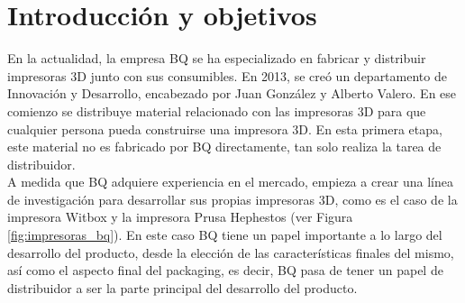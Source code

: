 \chapter{Introducción y objetivos}
\label{cap:introduccion}

En la actualidad, la empresa BQ se ha especializado en fabricar y distribuir impresoras 3D junto con sus consumibles. En 2013, se creó un departamento de Innovación y Desarrollo, encabezado por Juan González y Alberto Valero. En ese comienzo se distribuye material relacionado con las impresoras 3D para que cualquier persona pueda construirse una impresora 3D. En esta primera etapa, este material no es fabricado por BQ directamente, tan solo realiza la tarea de distribuidor.\\

A medida que BQ adquiere experiencia en el mercado, empieza a crear una línea de investigación para desarrollar sus propias impresoras 3D, como es el caso de la impresora Witbox y la impresora Prusa Hephestos (ver Figura \ref{fig:impresoras_bq}). En este caso BQ tiene un papel importante a lo largo del desarrollo del producto, desde la elección de las características finales del mismo, así como el aspecto final del packaging, es decir, BQ pasa de tener un papel de distribuidor a ser la parte principal del desarrollo del producto.

